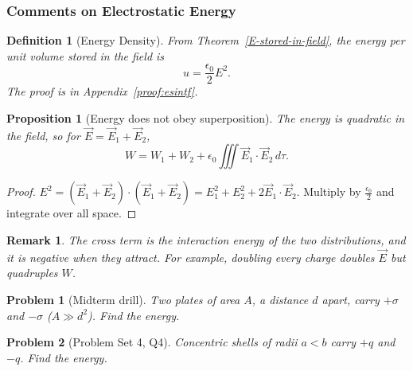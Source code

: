 \documentclass{article}
\newtheorem{definition}{Definition}
\newtheorem{problem}{Problem}
\newtheorem{remark}{Remark}
\newtheorem{proposition}{Proposition}
\begin{document}
\subsubsection{Comments on Electrostatic Energy}
\begin{definition}[Energy Density]
    From Theorem~\ref{E-stored-in-field}, the energy per unit volume stored in the field is
    \begin{equation}
        u = \frac{\epsilon_0}{2}E^2.
    \end{equation}
    The proof is in Appendix~\ref{proof:esintf}.
\end{definition}
\begin{proposition}[Energy does not obey superposition]
    The energy is quadratic in the field, so for $\vec{E} = \vec{E}_1 + \vec{E}_2$,
    \begin{equation}
        W = W_1 + W_2 + \epsilon_0\iiint\vec{E}_1\cdot\vec{E}_2\,d\tau.
    \end{equation}
\end{proposition}
\begin{proof}
    $E^2 = (\vec{E}_1 + \vec{E}_2)\cdot(\vec{E}_1 + \vec{E}_2) = E_1^2 + E_2^2 + 2\vec{E}_1\cdot\vec{E}_2$. Multiply by $\frac{\epsilon_0}{2}$ and integrate over all space.
\end{proof}
\begin{remark}
    The cross term is the interaction energy of the two distributions, and it is negative when they attract. For example, doubling every charge doubles $\vec{E}$ but quadruples $W$.
\end{remark}
\begin{problem}[Midterm drill]
    Two plates of area $A$, a distance $d$ apart, carry $+\sigma$ and $-\sigma$ ($A \gg d^2$). Find the energy.
\end{problem}
\begin{problem}[Problem Set 4, Q4]
    Concentric shells of radii $a < b$ carry $+q$ and $-q$. Find the energy.
\end{problem}
\end{document}

